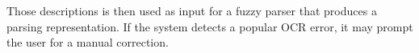 
Those descriptions is then used as input for a fuzzy parser 
that produces a parsing representation. %
If the system detects a popular OCR error, it may prompt the user for a
manual correction.

